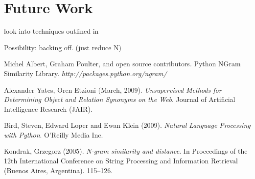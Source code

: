 \documentclass{article}
\begin{document}
\section{Future Work}
look into techniques outlined in \cite{ngram_sim}








Possibility: backing off. (just reduce N)

\begin{thebibliography}{1}

Michel Albert, Graham Poulter, and open source contributors. Python NGram Similarity Library. \textit{http://packages.python.org/ngram/}

Alexander Yates, Oren Etzioni (March, 2009). \textit{Unsupervised Methods for Determining Object and Relation Synonyms on the Web}. Journal of Artificial Intelligence Research (JAIR). 

Bird, Steven, Edward Loper and Ewan Klein (2009). \textit{Natural Language Processing with Python}.  O'Reilly Media Inc.

Kondrak, Grzegorz (2005). \textit{N-gram similarity and distance}. In Proceedings of the 12th International Conference on String Processing and Information Retrieval (Buenos Aires, Argentina). 115–126.

\end{thebibliography}
\end{document}
